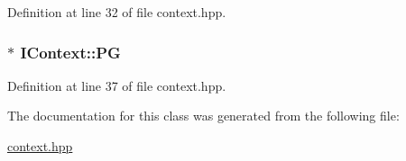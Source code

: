 Definition at line 32 of file context.hpp.\hypertarget{class_i_context_a1155fe76cd858044298e22b7b83ab326}{
\subsubsection[{PG}]{$\ast$ {\bf IContext::PG}}}
\label{class_i_context_a1155fe76cd858044298e22b7b83ab326}


Definition at line 37 of file context.hpp.

The documentation for this class was generated from the following file:\begin{DoxyCompactItemize}
\item 
\hyperlink{context_8hpp}{context.hpp}\end{DoxyCompactItemize}
